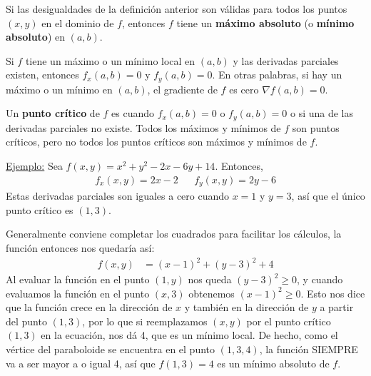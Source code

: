 \documentclass[12pt]{article}
\begin{document}
Si las desigualdades de la definición anterior son válidas para todos los puntos $ (x,y) $ en el dominio de $ f $, entonces $ f $ tiene un \textbf{máximo absoluto} (o \textbf{mínimo absoluto}) en $ (a,b) $.

Si $ f $ tiene un máximo o un mínimo local en $ (a,b) $ y las derivadas parciales existen, entonces $ f_{x}(a,b)=0 $ y $ f_{y}(a,b)=0 $. En otras palabras, si hay un máximo o un mínimo en $ (a,b) $, el gradiente de $ f $ es cero $ \nabla f(a,b)=0 $.

Un \textbf{punto crítico} de $ f $ es cuando $ f_{x}(a,b)=0 $ o $ f_{y}(a,b)=0 $ o si una de las derivadas parciales no existe. Todos los máximos y mínimos de $ f $ son puntos críticos, pero no todos los puntos críticos son máximos y mínimos de $ f $.

\underline{Ejemplo:} Sea $ f(x,y)=x^2 + y^2 - 2x-6y+14 $. Entonces,
\begin{align*}
	f_{x}(x,y) = 2x-2 && f_{y}(x,y)=2y-6
\end{align*}
Estas derivadas parciales son iguales a cero cuando $ x=1 $ y $ y=3 $, así que el único punto crítico es $ (1,3) $. 

Generalmente conviene completar los cuadrados para facilitar los cálculos, la función entonces nos quedaría así:
\begin{align*}
  f(x,y) &= (x-1)^2 + (y-3)^2 + 4
\end{align*}
Al evaluar la función en el punto $ (1, y) $ nos queda $ (y-3)^2 \geq 0 $, y cuando evaluamos la función en el punto $ (x,3) $ obtenemos $ (x-1)^2 \geq 0 $. Esto nos dice que la función crece en la dirección de $ x $ y también en la dirección de $ y $ a partir del punto $ (1,3) $, por lo que si reemplazamos $ (x,y) $ por el punto crítico $ (1,3) $ en la ecuación, nos dá 4, que es un mínimo local. De hecho, como el vértice del paraboloide se encuentra en el punto $ (1,3,4) $, la función SIEMPRE va a ser mayor a o igual 4, así que $ f(1,3)=4 $ es un mínimo absoluto de $ f $.

\begin{center}
\end{center}
\end{document}
